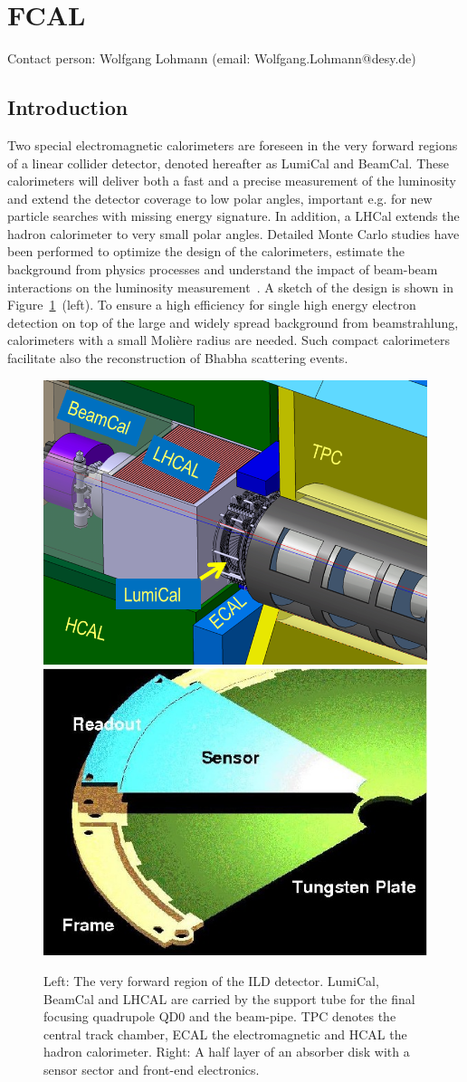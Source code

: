 \section{FCAL}
Contact person: Wolfgang Lohmann (email: Wolfgang.Lohmann@desy.de)
\subsection{Introduction}
Two special electromagnetic calorimeters are foreseen in the very forward regions of a linear collider detector, denoted hereafter as
LumiCal and BeamCal.
These calorimeters will deliver both a fast and a precise measurement of the luminosity
and extend the detector coverage to low polar angles,
important e.g. for new particle searches with missing energy signature.
In addition, a LHCal extends the hadron calorimeter to very small polar angles.
Detailed Monte Carlo studies have been performed to
optimize the design of the calorimeters, estimate the background from physics processes and understand the impact
of beam-beam interactions on the luminosity measurement~\cite{2010JInst...512002A}.
A sketch of the design is shown in Figure~\ref{fig:Forward_structure}~(left).
To ensure a high efficiency for single high energy electron detection on top of the large and widely spread
background from beamstrahlung, calorimeters with a small Moli\`{e}re radius are needed. Such compact calorimeters facilitate
also the reconstruction of Bhabha scattering events.
\begin{figure}[hbp]
  \centering
   \includegraphics[width=0.45\columnwidth]{Calorimeter/FCAL/figs/forward_region_new} \hfill
   \includegraphics[width=0.45\columnwidth]{Calorimeter/FCAL/figs/BClayer}
  \caption{Left: The very forward region of the ILD detector.
  LumiCal, BeamCal and LHCAL are carried by
  the support tube for the final focusing quadrupole QD0 and the beam-pipe.
  TPC denotes the central track chamber, ECAL the electromagnetic and
  HCAL the hadron calorimeter.
  Right: A half layer of an absorber disk with a sensor sector and front-end electronics.}
  \label{fig:Forward_structure}
\end{figure}
